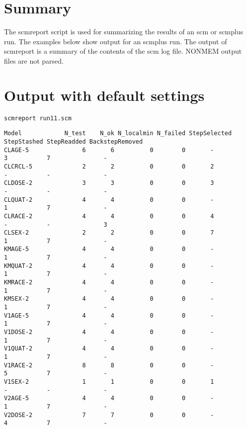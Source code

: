 \documentclass[hideglossary,notoc,hidelof,hidelot,hideTheSignaturePage,hideLinkCurrent,hideloa,pdfLatex,noClient,notitle,hideConfidential]{PMXstyle-20170118kajsa4}
\begin{document}
\section{Summary}
The scmreport script is used for summarizing the results of an scm or scmplus run.
The examples below show output for an scmplus run.
The output of scmreport is a summary of the contents of the scm log file. 
NONMEM output files are not parsed. 

\section{Output with default settings}
\begin{verbatim}
scmreport run11.scm
\end{verbatim}
{\tiny
\begin{verbatim}
Model            N_test    N_ok N_localmin N_failed StepSelected StepStashed StepReadded BackstepRemoved
CLAGE-5               6       6          0        0       -           3           7               -
CLCRCL-5              2       2          0        0       2           -           -               -
CLDOSE-2              3       3          0        0       3           -           -               -
CLQUAT-2              4       4          0        0       -           1           7               -
CLRACE-2              4       4          0        0       4           -           -               3
CLSEX-2               2       2          0        0       7           1           7               -
KMAGE-5               4       4          0        0       -           1           7               -
KMQUAT-2              4       4          0        0       -           1           7               -
KMRACE-2              4       4          0        0       -           1           7               -
KMSEX-2               4       4          0        0       -           1           7               -
V1AGE-5               4       4          0        0       -           1           7               -
V1DOSE-2              4       4          0        0       -           1           7               -
V1QUAT-2              4       4          0        0       -           1           7               -
V1RACE-2              8       8          0        0       -           5           7               -
V1SEX-2               1       1          0        0       1           -           -               -
V2AGE-5               4       4          0        0       -           1           7               -
V2DOSE-2              7       7          0        0       -           4           7               -

\end{verbatim}}
\end{document}
